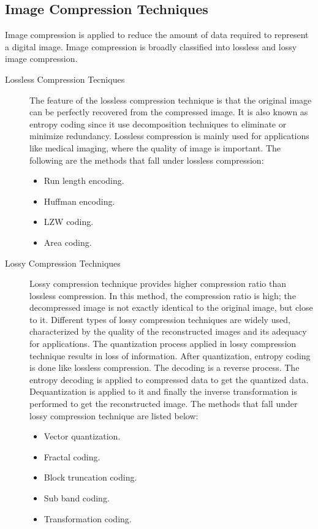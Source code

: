 \subsection{Image Compression Techniques}
Image compression is applied to reduce the amount of data required to represent a digital image. Image compression is broadly classified into lossless and lossy image compression\cite{Chandran:2012}.
\begin{description}
\item[Lossless Compression Tecniques] The feature of the lossless compression technique is that the original image can be perfectly recovered from the compressed image. It is also known as entropy coding since it use decomposition techniques to eliminate or minimize redundancy\cite{Woods:2008}. Lossless compression is mainly used for applications like medical imaging, where the quality of image is important. The following are the methods that fall under lossless compression:
	\begin{itemize}
	\item Run length encoding.
	\item Huffman encoding.
	\item LZW coding.
	\item Area coding.
	\end{itemize}
\item[Lossy Compression Techniques] Lossy compression technique provides higher compression ratio than lossless compression. In this method, the compression ratio is high; the decompressed image is not exactly identical to the original image, but close to it. Different types of lossy compression techniques are widely used, characterized by the quality of the reconstructed images and its adequacy for applications. The quantization process applied in lossy compression technique results in loss of information. After quantization, entropy coding is done like lossless compression. The decoding is a reverse process. The entropy decoding is applied to compressed data to get the quantized data. Dequantization is applied to it and finally the inverse transformation is performed to get the reconstructed image. The methods that fall under lossy compression technique are listed below:
	\begin{itemize}
	\item Vector quantization.
	\item Fractal coding.
	\item Block truncation coding.
	\item Sub band coding.
	\item Transformation coding.
	\end{itemize}
\end{description}

